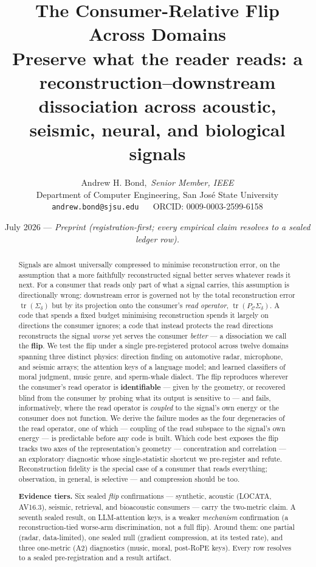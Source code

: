 \documentclass[11pt]{article}
\title{\textbf{The Consumer-Relative Flip Across Domains}\\[2pt]
\large Preserve what the reader reads: a reconstruction--downstream dissociation
across acoustic, seismic, neural, and biological signals}
\author{Andrew H. Bond,~\emph{Senior Member, IEEE}\\ \small Department of Computer Engineering, San Jos\'e State University\\
\small \texttt{andrew.bond@sjsu.edu} ~\textbar~ ORCID: 0009-0003-2599-6158}
\date{July 2026 --- \emph{Preprint (registration-first; every empirical claim resolves to a sealed ledger row).}}
\theoremstyle{remark}
\newcommand{\PC}{P_{\mathcal{C}}}
\newcommand{\Sd}{\Sigma_{\delta}}
\newcommand{\tr}{\operatorname{tr}}
\begin{document}
\maketitle

\begin{abstract}
Signals are almost universally compressed to minimise reconstruction error, on the
assumption that a more faithfully reconstructed signal better serves whatever reads it
next. For a consumer that reads only part of what a signal carries, this assumption is
directionally wrong: downstream error is governed not by the total reconstruction error
$\tr(\Sd)$ but by its projection onto the consumer's \emph{read operator},
$\tr(\PC\Sd)$. A code that spends a fixed budget minimising reconstruction spends it
largely on directions the consumer ignores; a code that instead protects the read
directions reconstructs the signal \emph{worse} yet serves the consumer \emph{better}
--- a dissociation we call the \textbf{flip}. We test the flip under a single
pre-registered protocol across twelve domains spanning three distinct physics:
direction finding on automotive radar, microphone, and seismic arrays; the attention
keys of a language model; and learned classifiers of moral judgment, music genre, and
sperm-whale dialect. The flip reproduces wherever the consumer's read operator is
\textbf{identifiable} --- given by the geometry, or recovered blind from the consumer by
probing what its output is sensitive to --- and fails, informatively, where the
read operator is \emph{coupled} to the signal's own energy or the consumer does not
function. We derive the failure modes as the four degeneracies of the read operator, one of which
--- coupling of the read subspace to the signal's own energy --- is predictable before any
code is built. Which code best exposes the flip tracks
two axes of the representation's geometry --- concentration and correlation --- an
exploratory diagnostic whose single-statistic shortcut we pre-register and refute. Reconstruction fidelity is the
special case of a consumer that reads everything; observation, in general, is selective
--- and compression should be too.

\medskip
\noindent\textbf{Evidence tiers.} Six sealed \emph{flip} confirmations --- synthetic,
acoustic (LOCATA, AV16.3), seismic, retrieval, and bioacoustic consumers --- carry the
two-metric claim. A seventh sealed result, on LLM-attention keys, is a weaker
\emph{mechanism} confirmation (a reconstruction-tied worse-arm discrimination, not a full
flip). Around them: one partial (radar, data-limited), one sealed null (gradient
compression, at its tested rate), and three one-metric (A2) diagnostics (music, moral,
post-RoPE keys). Every row resolves to a sealed pre-registration and a result artifact.
\end{abstract}
\end{document}
